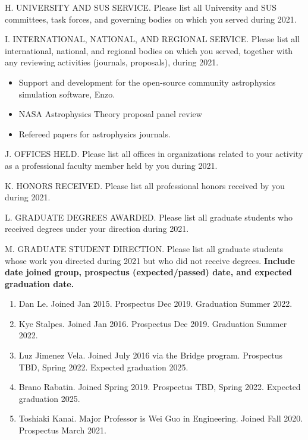\noindent H. UNIVERSITY AND SUS SERVICE. Please list all University
and SUS committees, task forces, and governing bodies on which you
served during 2021.
\bigskip
%

\noindent I. INTERNATIONAL, NATIONAL, AND REGIONAL  SERVICE. Please
list all international, national, and regional bodies on which you
served, together with any reviewing activities (journals,
proposals), during 2021.
\bigskip

\begin{itemize}
    \item Support and development for the open-source community astrophysics
        simulation software, Enzo.
    \item NASA Astrophysics Theory proposal panel review
    \item Refereed papers for astrophysics journals.
\end{itemize}

\noindent J. OFFICES HELD. Please list all offices in organizations
related to your activity as a professional faculty member held by
you during 2021.
\bigskip

\noindent K. HONORS RECEIVED. Please list all professional honors
received by you during 2021.
\bigskip

\noindent L. GRADUATE DEGREES AWARDED. Please list all graduate
students who received degrees under your direction during 2021.
\bigskip

\noindent M. GRADUATE STUDENT DIRECTION. Please list all graduate
students whose work you directed during 2021 but who did not receive
degrees. {\bf Include date joined group, prospectus (expected/passed) date, 
and expected graduation date.}
\bigskip

\begin{enumerate}
    \item Dan Le.  Joined Jan 2015.  Prospectus Dec 2019.   Graduation Summer
        2022.
    \item Kye Stalpes.  Joined Jan 2016.  Prospectus Dec 2019.  Graduation
        Summer 2022.
    \item Luz Jimenez Vela.  Joined July 2016 via the Bridge program.
        Prospectus TBD, Spring 2022.  Expected graduation 2025.
    \item Brano Rabatin.  Joined Spring 2019.  Prospectus TBD, Spring 2022.
        Expected graduation 2025.
    \item Toshiaki Kanai.  Major Professor is Wei Guo in Engineering.  Joined
        Fall 2020.  Prospectus March 2021.  
\end{enumerate}

